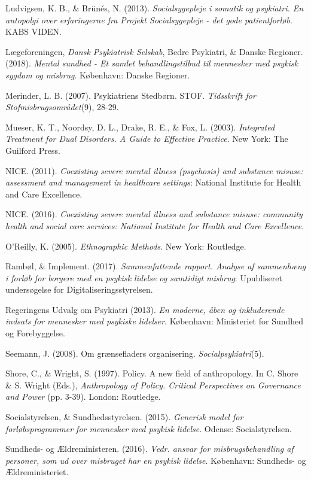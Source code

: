 \begin{thebibliography}{99}
\item Ludvigsen, K. B., \& Brünés, N. (2013). \textit{Socialsygepleje i somatik og psykiatri. En antopolgi over erfaringerne fra Projekt Socialsygepleje - det gode patientforløb}. KABS VIDEN.
\item Lægeforeningen, \textit{Dansk Psykiatrisk Selskab}, Bedre Psykiatri, \& Danske Regioner. (2018). \textit{Mental sundhed - Et samlet behandlingstilbud til mennesker med psykisk sygdom og misbrug}. København: Danske Regioner.
\item Merinder, L. B. (2007). Psykiatriens Stedbørn. STOF. \textit{Tidsskrift for Stofmisbrugsområdet}(9), 28-29. 
\item Mueser, K. T., Noordsy, D. L., Drake, R. E., \& Fox, L. (2003). \textit{Integrated Treatment for Dual Disorders. A Guide to Effective Practice}. New York: The Guilford Press.
\item NICE. (2011). \textit{Coexisting severe mental illness (psychosis) and substance misuse: assessment and management in healthcare settings}: National Institute for Health and Care Excellence.
\item NICE. (2016). \textit{Coexisting severe mental illness and substance misuse: community health and social care services: National Institute for Health and Care Excellence}.
\item O'Reilly, K. (2005). \textit{Ethnographic Methods}. New York: Routledge.
\item Rambøl, \& Implement. (2017). \textit{Sammenfattende rapport. Analyse af sammenhæng i forløb for borgere med en psykisk lidelse og samtidigt misbrug}: Upubliseret undersøgelse for Digitaliseringsstyrelsen.
\item Regeringens Udvalg om Psykiatri (2013). \textit{En moderne, åben og inkluderende indsats for mennesker med psykiske lidelser}. København: Ministeriet for Sundhed og Forebyggelse.
\item Seemann, J. (2008). Om grænsefladers organisering. \textit{Socialpsykiatri}(5). 
\item Shore, C., \& Wright, S. (1997). Policy. A new field of anthropology. In C. Shore \& S. Wright (Eds.), \textit{Anthropology of Policy. Critical Perspectives on Governance and Power} (pp. 3-39). London: Routledge.
\item Socialstyrelsen, \& Sundhedsstyrelsen. (2015). \textit{Generisk model for forløbsprogrammer for mennesker med psykisk lidelse}. Odense: Socialstyrelsen.
\item Sundheds- og Ældreministeren. (2016). \textit{Vedr. ansvar for misbrugsbehandling af personer, som ud over misbruget har en psykisk lidelse}. København: Sundheds- og Ældreministeriet.

\end{thebibliography}
